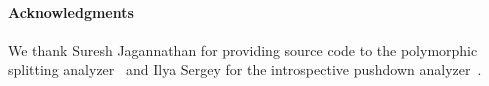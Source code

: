 \documentclass[preprint,onecolumn,9pt]{sigplanconf} %
\begin{document}



\paragraph{Acknowledgments}

We thank Suresh Jagannathan for providing source code to the
polymorphic splitting
analyzer~\cite{dvanhorn:wright-jagannathan-toplas98} and Ilya Sergey
for the introspective pushdown
analyzer~\cite{dvanhorn:Earl2012Introspective}.


\balance

%



% 
\end{document}
